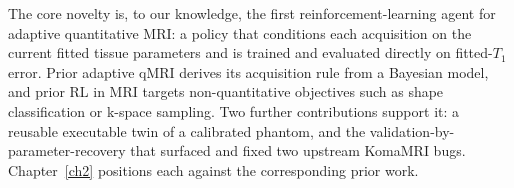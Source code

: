 The core novelty is, to our knowledge, the first reinforcement-learning agent
for adaptive quantitative MRI: a policy that conditions each acquisition on the
current fitted tissue parameters and is trained and evaluated directly on
fitted-$T_1$ error. Prior adaptive qMRI derives its acquisition rule from a
Bayesian model, and prior RL in MRI targets non-quantitative objectives such as
shape classification or k-space sampling. Two further contributions support it:
a reusable executable twin of a calibrated phantom, and the
validation-by-parameter-recovery that surfaced and fixed two upstream KomaMRI
bugs. Chapter~\ref{ch2} positions each against the corresponding prior work.
